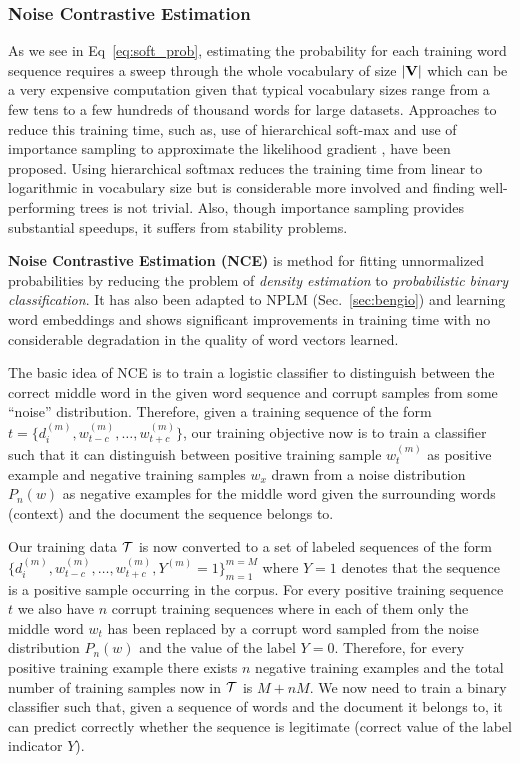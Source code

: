 \subsubsection{Noise Contrastive Estimation}
As we see in Eq~\ref{eq:soft_prob}, estimating the probability for each training word sequence requires a sweep through the whole vocabulary of size $|\mathbf{V}|$ which can be a very expensive computation given that typical vocabulary sizes range from a few tens to a few hundreds of thousand words for large datasets. Approaches to reduce this training time, such as, use of hierarchical soft-max \citep{morin2005hierarchical} and use of importance sampling to approximate the likelihood gradient \citep{bengio2003quick}, \citep{bengio2008adaptive} have been proposed. Using hierarchical softmax reduces the training time from linear to logarithmic in vocabulary size but is considerable more involved and finding well-performing trees is not trivial. Also, though importance sampling provides substantial speedups, it suffers from stability problems.

\textbf{Noise Contrastive Estimation (NCE)} \citep{gutmann2012noise} is method for fitting unnormalized probabilities by reducing the problem of \emph{density estimation} to \emph{probabilistic binary classification}. It has also been adapted to NPLM (Sec.~\ref{sec:bengio}) \citep{mnih2012fast} and learning word embeddings \cite{mnih2013learning} and shows significant improvements in training time with no considerable degradation in the quality of word vectors learned.

The basic idea of NCE is to train a logistic classifier to distinguish between the correct middle word in the given word sequence and corrupt samples from some ``noise'' distribution. Therefore, given a training sequence of the form $t = \{d^{(m)}_{i}, w^{(m)}_{t-c}, \ldots, w^{(m)}_{t+c}\}$, our training objective now is to train a classifier such that it can distinguish between positive training sample $w^{(m)}_{t}$ as positive example and negative training samples $w_{x}$ drawn from a noise distribution $P_{n}(w)$ as negative examples for the middle word given the surrounding words (context) and the document the sequence belongs to.

Our training data $\mathcal{T}$ is now converted to a set of labeled sequences of the form 
$ \{d^{(m)}_{i}, w^{(m)}_{t-c}, \ldots, w^{(m)}_{t+c}, Y^{(m)}=1\}^{m=M}_{m=1} $
where $Y=1$ denotes that the sequence is a positive sample occurring in the corpus. For every positive training sequence $t$ we also have $n$ corrupt training sequences where in each of them only the middle word $w_{t}$ has been replaced by a corrupt word sampled from the noise distribution $P_{n}(w)$ and the value of the label $Y=0$. Therefore, for every positive training example there exists $n$ negative training examples and the total number of training samples now in $\mathcal{T}$ is $M + nM$. We now need to train a binary classifier such that, given a sequence of words and the document it belongs to, it can predict correctly whether the sequence is legitimate (correct value of the label indicator $Y$). 

